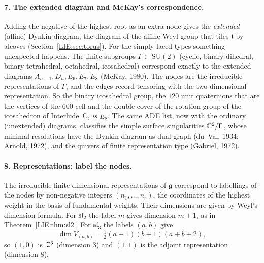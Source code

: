 \paragraph{7. The extended diagram and McKay's correspondence.} Adding the negative of the highest
root as an extra node gives the \emph{extended} (affine) Dynkin diagram, the diagram of the affine
Weyl group that tiles $\mathfrak t$ by alcoves (Section~\ref{LIE:sec:torus}). For the simply laced types
something unexpected happens. The finite subgroups $\Gamma\subset\mathrm{SU}(2)$ (cyclic, binary dihedral,
binary tetrahedral, octahedral, icosahedral) correspond exactly to the extended diagrams
$\tilde A_{n-1},\tilde D_n,\tilde E_6,\tilde E_7,\tilde E_8$ (McKay, 1980). The nodes are the
irreducible representations of $\Gamma$, and the edges record tensoring with the two-dimensional
representation. So the binary icosahedral group, the $120$ unit quaternions that are the vertices of
the $600$-cell and the double cover of the rotation group of the icosahedron of Interlude~C, \emph{is}
$\tilde E_8$. The same ADE list, now with the ordinary (unextended) diagrams, classifies the simple
surface singularities $\mathbb{C}^2/\Gamma$, whose minimal resolutions have the Dynkin diagram as dual graph
(du~Val, 1934; Arnold, 1972), and the quivers of finite representation type (Gabriel, 1972).

\paragraph{8. Representations: label the nodes.} The irreducible finite-dimensional representations
of $\mathfrak g$ correspond to labellings of the nodes by non-negative integers $(n_1,\dots,n_r)$, the
coordinates of the highest weight in the basis of fundamental weights. Their dimensions are given by
Weyl's dimension formula. For $\mathfrak{sl}_2$ the label $m$ gives dimension $m+1$, as in
Theorem~\ref{LIE:thm:sl2}. For $\mathfrak{sl}_3$ the labels $(a,b)$ give
\[
  \dim V_{(a,b)}=\tfrac12(a+1)(b+1)(a+b+2),
\]
so $(1,0)$ is $\mathbb{C}^3$ (dimension $3$) and $(1,1)$ is the adjoint representation (dimension $8$).


